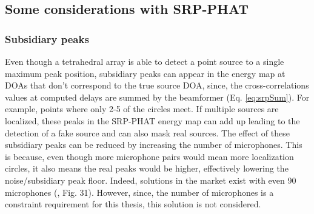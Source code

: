 \subsection{Some considerations with SRP-PHAT}
\subsubsection{Subsidiary peaks}
Even though a tetrahedral array is able to detect a point source to a single maximum peak position, subsidiary peaks can appear in the energy map at DOAs that don't correspond to the true source DOA, since, the cross-correlations values at computed delays are summed by the beamformer (Eq. \ref{eq:srpSum}). For example, points where only 2-5 of the circles meet. If multiple sources are localized, these peaks in the SRP-PHAT energy map can add up leading to the detection of a fake source and can also mask real sources. The effect of these subsidiary peaks can be reduced by increasing the number of microphones. This is because, even though more microphone pairs would mean more localization circles, it also means the real peaks would be higher, effectively lowering the noise/subsidiary peak floor. Indeed, solutions in the market exist with even 90 microphones (\cite{batel2003noise}, Fig. 31). However, since, the number of microphones is a constraint requirement for this thesis, this solution is not considered.
